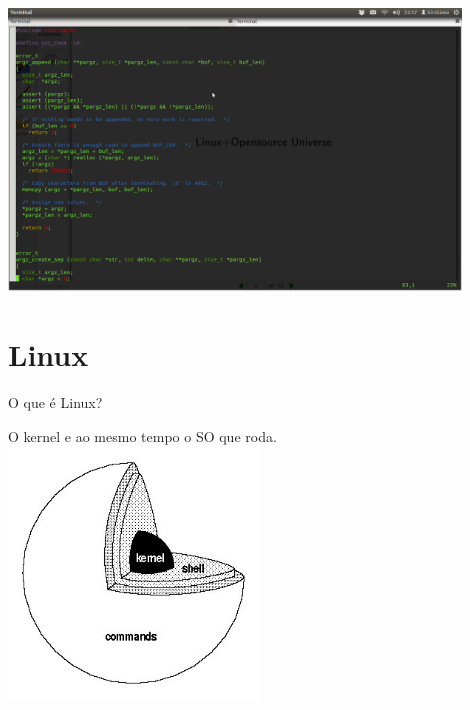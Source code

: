 \documentclass{beamer}
\begin{document}
\begin{frame}

\begin{center}
 \includegraphics[width=0.9\textwidth]{images/opensource.png}
\end{center}
\end{frame}


\section{Linux} 

\begin{frame}{O que \'e Linux?}

\begin{center}
 O kernel e ao mesmo tempo o SO que roda.
\includegraphics[width=0.5\textwidth]{images/kernel.jpg}
\end{center}

\end{frame}
\end{document}

